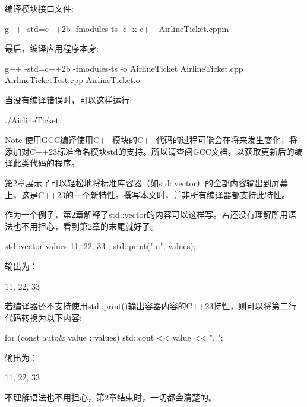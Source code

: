 编译模块接口文件:

\begin{shell}
g++ -std=c++2b -fmodules-ts -c -x c++ AirlineTicket.cppm
\end{shell}

最后，编译应用程序本身:

\begin{shell}
g++ -std=c++2b -fmodules-ts -o AirlineTicket AirlineTicket.cpp AirlineTicketTest.cpp AirlineTicket.o
\end{shell}

当没有编译错误时，可以这样运行:

\begin{shell}
./AirlineTicket
\end{shell}

\begin{myNotic}{Note}
使用GCC编译使用C++模块的C++代码的过程可能会在将来发生变化，将添加对C++23标准命名模块std的支持。所以请查阅GCC文档，以获取更新后的编译此类代码的程序。
\end{myNotic}


第2章展示了可以轻松地将标准库容器（如std::vector）的全部内容输出到屏幕上，这是C++23的一个新特性。撰写本文时，并非所有编译器都支持此特性。

作为一个例子，第2章解释了std::vector的内容可以这样写。若还没有理解所用语法也不用担心，看到第2章的末尾就好了。

\begin{cpp}
std::vector values { 11, 22, 33 };
std::print("{:n}", values);
\end{cpp}

输出为：

\begin{shell}
11, 22, 33
\end{shell}

若编译器还不支持使用std::print()输出容器内容的C++23特性，则可以将第二行代码转换为以下内容:

\begin{cpp}
for (const auto& value : values) { std::cout << value << ", "; }
\end{cpp}

输出为：

\begin{shell}
11, 22, 33
\end{shell}

不理解语法也不用担心，第2章结束时，一切都会清楚的。


